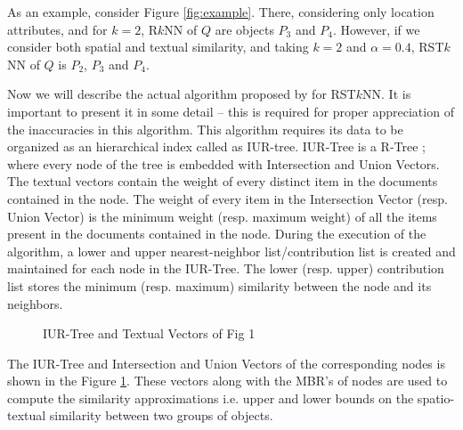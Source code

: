 \documentclass[prodmode,letterpaper]{acmsmall}
\newcommand{\rknn}{R$k$NN\xspace}
\newcommand{\rstknn}{RST$k$NN\xspace}
\begin{document}
As an example, consider Figure \ref{fig:example}. There, considering only
location attributes, and for $k=2$, \rknn of $Q$ are objects $P_3$ and $P_4$.
However, if we consider both spatial and textual similarity, and taking $k=2$
and $\alpha=0.4$, \rstknn of $Q$ is $P_2$, $P_3$ and $P_4$.

Now we will describe the actual algorithm proposed by \cite{lu2011reverse} for 
\rstknn. It is important to present it in some detail -- this is required for
proper appreciation of the inaccuracies in this algorithm. This algorithm
requires its data to be organized as an hierarchical index called as
IUR-tree. IUR-Tree is a R-Tree \cite{guttman1984r}; where every node of the tree is embedded with Intersection and Union Vectors. The textual vectors contain the weight of every distinct item in the documents contained in the node. The weight of every item in the Intersection Vector (resp. Union Vector) is the minimum weight (resp. maximum weight) of all the items present in the documents contained in the node. During the execution of the algorithm, a lower and upper nearest-neighbor list/contribution list is created and maintained for each node in the IUR-Tree. The lower (resp. upper) contribution list stores the minimum (resp. maximum) similarity between the node and its neighbors.
\begin{figure}[!tbh]
\begin{center}

\caption{\small IUR-Tree and Textual Vectors of Fig 1 \label{fig:IUR}}
\end{center}

\end{figure}

The IUR-Tree and Intersection and Union Vectors of the corresponding nodes is shown in the Figure \ref{fig:IUR}.
 These vectors along with the MBR's of nodes are used to compute the similarity approximations i.e. upper and lower bounds on the spatio-textual similarity between two groups of objects. 
\end{document}
